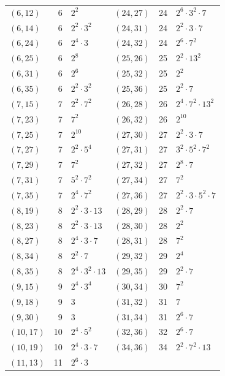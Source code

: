 \documentclass[11pt]{article}
\begin{document}
\begin{longtable}{@{}lrl@{\qquad}lrl@{}}
$(6,12)$ & 6 & $2^{2}$ & $(24,27)$ & 24 & $2^{6}\cdot 3^{2}\cdot 7$\\
$(6,14)$ & 6 & $2^{2}\cdot 3^{2}$ & $(24,31)$ & 24 & $2^{2}\cdot 3\cdot 7$\\
$(6,24)$ & 6 & $2^{4}\cdot 3$ & $(24,32)$ & 24 & $2^{6}\cdot 7^{2}$\\
$(6,25)$ & 6 & $2^{8}$ & $(25,26)$ & 25 & $2^{2}\cdot 13^{2}$\\
$(6,31)$ & 6 & $2^{6}$ & $(25,32)$ & 25 & $2^{2}$\\
$(6,35)$ & 6 & $2^{2}\cdot 3^{2}$ & $(25,36)$ & 25 & $2^{2}\cdot 7$\\
$(7,15)$ & 7 & $2^{2}\cdot 7^{2}$ & $(26,28)$ & 26 & $2^{4}\cdot 7^{2}\cdot 13^{2}$\\
$(7,23)$ & 7 & $7^{2}$ & $(26,32)$ & 26 & $2^{10}$\\
$(7,25)$ & 7 & $2^{10}$ & $(27,30)$ & 27 & $2^{2}\cdot 3\cdot 7$\\
$(7,27)$ & 7 & $2^{2}\cdot 5^{4}$ & $(27,31)$ & 27 & $3^{2}\cdot 5^{2}\cdot 7^{2}$\\
$(7,29)$ & 7 & $7^{2}$ & $(27,32)$ & 27 & $2^{8}\cdot 7$\\
$(7,31)$ & 7 & $5^{2}\cdot 7^{2}$ & $(27,34)$ & 27 & $7^{2}$\\
$(7,35)$ & 7 & $2^{4}\cdot 7^{2}$ & $(27,36)$ & 27 & $2^{2}\cdot 3\cdot 5^{2}\cdot 7$\\
$(8,19)$ & 8 & $2^{2}\cdot 3\cdot 13$ & $(28,29)$ & 28 & $2^{2}\cdot 7$\\
$(8,23)$ & 8 & $2^{2}\cdot 3\cdot 13$ & $(28,30)$ & 28 & $2^{2}$\\
$(8,27)$ & 8 & $2^{4}\cdot 3\cdot 7$ & $(28,31)$ & 28 & $7^{2}$\\
$(8,34)$ & 8 & $2^{2}\cdot 7$ & $(29,32)$ & 29 & $2^{4}$\\
$(8,35)$ & 8 & $2^{4}\cdot 3^{2}\cdot 13$ & $(29,35)$ & 29 & $2^{2}\cdot 7$\\
$(9,15)$ & 9 & $2^{4}\cdot 3^{4}$ & $(30,34)$ & 30 & $7^{2}$\\
$(9,18)$ & 9 & $3$ & $(31,32)$ & 31 & $7$\\
$(9,30)$ & 9 & $3$ & $(31,34)$ & 31 & $2^{6}\cdot 7$\\
$(10,17)$ & 10 & $2^{4}\cdot 5^{2}$ & $(32,36)$ & 32 & $2^{6}\cdot 7$\\
$(10,19)$ & 10 & $2^{4}\cdot 3\cdot 7$ & $(34,36)$ & 34 & $2^{2}\cdot 7^{2}\cdot 13$\\
$(11,13)$ & 11 & $2^{6}\cdot 3$ & & &\\
\end{longtable}
\endgroup
\end{document}
